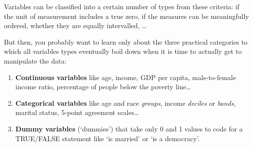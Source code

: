 Variables can be classified into a certain number of types from these criteria: if the unit of measurement includes a true zero, if the measures can be meaningfully ordered, whether they are equally intervalled, …

But then, you probably want to learn only about the three practical categories to which all variables types eventually boil down when it is time to actually get to manipulate the data:

\begin{enumerate}
	\item \textbf{Continuous variables} like age, income, GDP per capita, male-to-female income ratio, percentage of people below the poverty line…
	\item \textbf{Categorical variables} like age and race \emph{groups}, income \emph{deciles} or \emph{bands}, marital status, 5-point agreement scales…
	\item \textbf{Dummy variables} (`dummies') that take only 0 and 1 values to code for a TRUE/FALSE statement like `is married' or `is a democracy'.
\end{enumerate}

